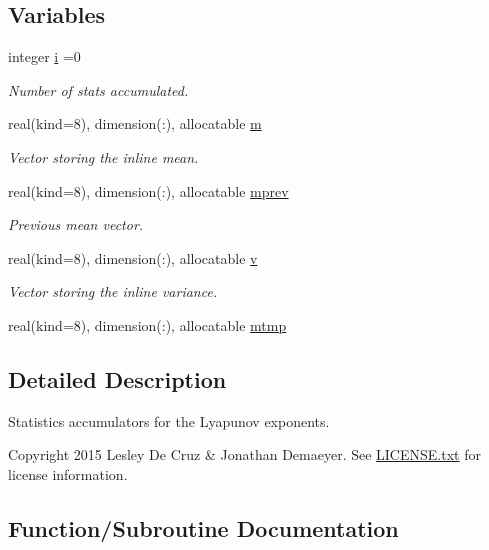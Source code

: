 \subsection*{Variables}
\begin{DoxyCompactItemize}
\item 
integer \hyperlink{namespacelyap__stat_ae22963543caef680f536738ad6018008}{i} =0
\begin{DoxyCompactList}\small\item\em Number of stats accumulated. \end{DoxyCompactList}\item 
real(kind=8), dimension(\+:), allocatable \hyperlink{namespacelyap__stat_a99687dc4df185df56e841e0d87d1faae}{m}
\begin{DoxyCompactList}\small\item\em Vector storing the inline mean. \end{DoxyCompactList}\item 
real(kind=8), dimension(\+:), allocatable \hyperlink{namespacelyap__stat_ad4c65ab53e8f6e8d6a967fd7bc0caa60}{mprev}
\begin{DoxyCompactList}\small\item\em Previous mean vector. \end{DoxyCompactList}\item 
real(kind=8), dimension(\+:), allocatable \hyperlink{namespacelyap__stat_a7cc5265a7fac9300755528c599fb08fb}{v}
\begin{DoxyCompactList}\small\item\em Vector storing the inline variance. \end{DoxyCompactList}\item 
real(kind=8), dimension(\+:), allocatable \hyperlink{namespacelyap__stat_a72cd3ecc682d386dbe39e331afa90f9f}{mtmp}
\end{DoxyCompactItemize}


\subsection{Detailed Description}
Statistics accumulators for the Lyapunov exponents. 

\begin{DoxyCopyright}{Copyright}
2015 Lesley De Cruz \& Jonathan Demaeyer. See \hyperlink{LICENSE_8txt}{L\+I\+C\+E\+N\+S\+E.\+txt} for license information. 
\end{DoxyCopyright}


\subsection{Function/\+Subroutine Documentation}
